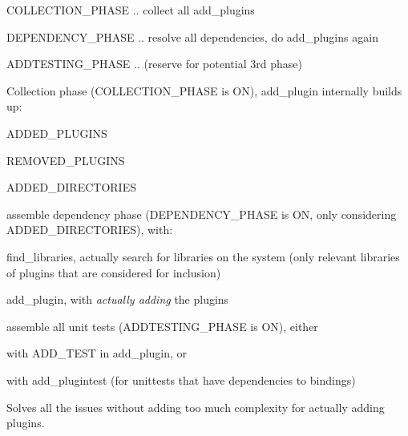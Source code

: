 \begin{DoxyItemize}
\item {\ttfamily C\+O\+L\+L\+E\+C\+T\+I\+O\+N\+\_\+\+P\+H\+A\+SE} .. collect all {\ttfamily add\+\_\+plugins}
\item {\ttfamily D\+E\+P\+E\+N\+D\+E\+N\+C\+Y\+\_\+\+P\+H\+A\+SE} .. resolve all dependencies, do {\ttfamily add\+\_\+plugins} again
\item {\ttfamily A\+D\+D\+T\+E\+S\+T\+I\+N\+G\+\_\+\+P\+H\+A\+SE} .. (reserve for potential 3rd phase)
\end{DoxyItemize}
\begin{DoxyEnumerate}
\item Collection phase ({\ttfamily C\+O\+L\+L\+E\+C\+T\+I\+O\+N\+\_\+\+P\+H\+A\+SE} is {\ttfamily ON}), add\+\_\+plugin internally builds up\+:
\begin{DoxyItemize}
\item {\ttfamily A\+D\+D\+E\+D\+\_\+\+P\+L\+U\+G\+I\+NS}
\item {\ttfamily R\+E\+M\+O\+V\+E\+D\+\_\+\+P\+L\+U\+G\+I\+NS}
\item {\ttfamily A\+D\+D\+E\+D\+\_\+\+D\+I\+R\+E\+C\+T\+O\+R\+I\+ES}
\end{DoxyItemize}
\item assemble dependency phase ({\ttfamily D\+E\+P\+E\+N\+D\+E\+N\+C\+Y\+\_\+\+P\+H\+A\+SE} is {\ttfamily ON}, only considering {\ttfamily A\+D\+D\+E\+D\+\_\+\+D\+I\+R\+E\+C\+T\+O\+R\+I\+ES}), with\+:
\begin{DoxyItemize}
\item {\ttfamily find\+\_\+libraries}, actually search for libraries on the system (only relevant libraries of plugins that are considered for inclusion)
\item {\ttfamily add\+\_\+plugin}, with {\itshape actually adding} the plugins
\end{DoxyItemize}
\item assemble all unit tests ({\ttfamily A\+D\+D\+T\+E\+S\+T\+I\+N\+G\+\_\+\+P\+H\+A\+SE} is {\ttfamily ON}), either
\begin{DoxyItemize}
\item with {\ttfamily A\+D\+D\+\_\+\+T\+E\+ST} in {\ttfamily add\+\_\+plugin}, or
\item with {\ttfamily add\+\_\+plugintest} (for unittests that have dependencies to bindings)
\end{DoxyItemize}
\end{DoxyEnumerate}

Solves all the issues without adding too much complexity for actually adding plugins.

